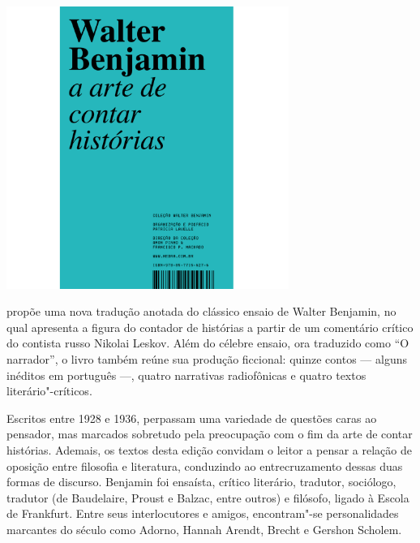 \begin{center}
\hspace*{-2.5cm}
\hspace*{2.5cm}\includegraphics[width=92mm]{./grid/benjamin.jpg}
\end{center}

\hspace*{-7cm}\hrulefill\hspace*{-7cm}

\medskip

 propõe uma nova tradução anotada do clássico ensaio de Walter Benjamin, no qual apresenta a figura do contador de histórias a partir de um comentário crítico do contista russo Nikolai Leskov. Além do célebre ensaio, ora traduzido como “O narrador”, o livro também reúne sua produção ficcional: quinze contos --- alguns inéditos em português ---, quatro narrativas radiofônicas e quatro textos literário"-críticos.

Escritos entre 1928 e 1936, perpassam uma variedade de questões caras ao pensador, mas marcados sobretudo pela preocupação com o fim da arte de contar histórias. Ademais, os textos desta edição convidam o leitor a pensar a relação de oposição entre filosofia e literatura, conduzindo ao entrecruzamento dessas duas formas de discurso. Benjamin foi ensaísta, crítico literário, tradutor, sociólogo, tradutor (de Baudelaire, Proust e Balzac, entre outros) e filósofo, ligado à Escola de Frankfurt. Entre seus interlocutores e amigos, encontram"-se personalidades marcantes do século  como Adorno, Hannah Arendt, Brecht e Gershon Scholem.

